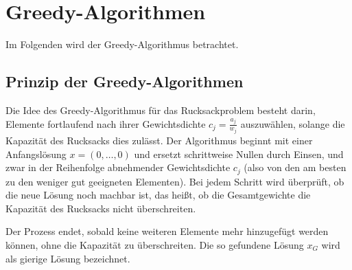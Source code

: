 \documentclass[12pt]{report}
\begin{document}

\chapter{Greedy-Algorithmen}
Im Folgenden wird der Greedy-Algorithmus betrachtet.


\section{Prinzip der Greedy-Algorithmen}
Die Idee des Greedy-Algorithmus für das Rucksackproblem besteht darin, Elemente fortlaufend nach ihrer Gewichtsdichte \( c_j = \frac{a_j}{w_j} \) auszuwählen, solange die Kapazität des Rucksacks dies zulässt. Der Algorithmus beginnt mit einer Anfangslösung \( x = (0, \ldots, 0) \) und ersetzt schrittweise Nullen durch Einsen, und zwar in der Reihenfolge abnehmender Gewichtsdichte \( c_j \) (also von den am besten zu den weniger gut geeigneten Elementen). Bei jedem Schritt wird überprüft, ob die neue Lösung noch machbar ist, das heißt, ob die Gesamtgewichte die Kapazität des Rucksacks nicht überschreiten.

Der Prozess endet, sobald keine weiteren Elemente mehr hinzugefügt werden können, ohne die Kapazität zu überschreiten. Die so gefundene Lösung \( x_G \) wird als gierige Lösung bezeichnet. \cite{diubin2003average}

\end{document}
